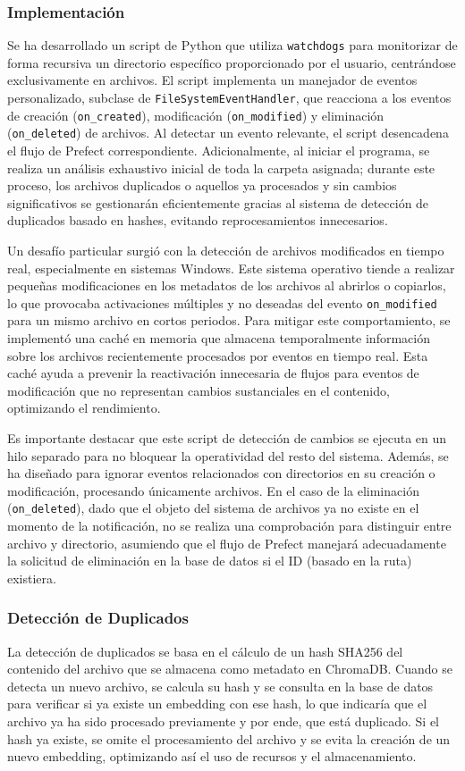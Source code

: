 \subsubsection{Implementación}
Se ha desarrollado un script de Python que utiliza \texttt{watchdogs} para monitorizar de forma recursiva un directorio específico proporcionado por el usuario, centrándose exclusivamente en archivos. El script implementa un manejador de eventos personalizado, subclase de \texttt{FileSystemEventHandler}, que reacciona a los eventos de creación (\texttt{on\_created}), modificación (\texttt{on\_modified}) y eliminación (\texttt{on\_deleted}) de archivos. Al detectar un evento relevante, el script desencadena el flujo de Prefect correspondiente. Adicionalmente, al iniciar el programa, se realiza un análisis exhaustivo inicial de toda la carpeta asignada; durante este proceso, los archivos duplicados o aquellos ya procesados y sin cambios significativos se gestionarán eficientemente gracias al sistema de detección de duplicados basado en hashes, evitando reprocesamientos innecesarios.

Un desafío particular surgió con la detección de archivos modificados en tiempo real, especialmente en sistemas Windows. Este sistema operativo tiende a realizar pequeñas modificaciones en los metadatos de los archivos al abrirlos o copiarlos, lo que provocaba activaciones múltiples y no deseadas del evento \texttt{on\_modified} para un mismo archivo en cortos periodos. Para mitigar este comportamiento, se implementó una caché en memoria que almacena temporalmente información sobre los archivos recientemente procesados por eventos en tiempo real. Esta caché ayuda a prevenir la reactivación innecesaria de flujos para eventos de modificación que no representan cambios sustanciales en el contenido, optimizando el rendimiento.

Es importante destacar que este script de detección de cambios se ejecuta en un hilo separado para no bloquear la operatividad del resto del sistema. Además, se ha diseñado para ignorar eventos relacionados con directorios en su creación o modificación, procesando únicamente archivos. En el caso de la eliminación (\texttt{on\_deleted}), dado que el objeto del sistema de archivos ya no existe en el momento de la notificación, no se realiza una comprobación para distinguir entre archivo y directorio, asumiendo que el flujo de Prefect manejará adecuadamente la solicitud de eliminación en la base de datos si el ID (basado en la ruta) existiera.

\subsubsection{Detección de Duplicados}
La detección de duplicados se basa en el cálculo de un hash SHA256 del contenido del archivo que se almacena como metadato en ChromaDB. Cuando se detecta un nuevo archivo, se calcula su hash y se consulta en la base de datos para verificar si ya existe un embedding con ese hash, lo que indicaría que el archivo ya ha sido procesado previamente y por ende, que está duplicado. Si el hash ya existe, se omite el procesamiento del archivo y se evita la creación de un nuevo embedding, optimizando así el uso de recursos y el almacenamiento.

